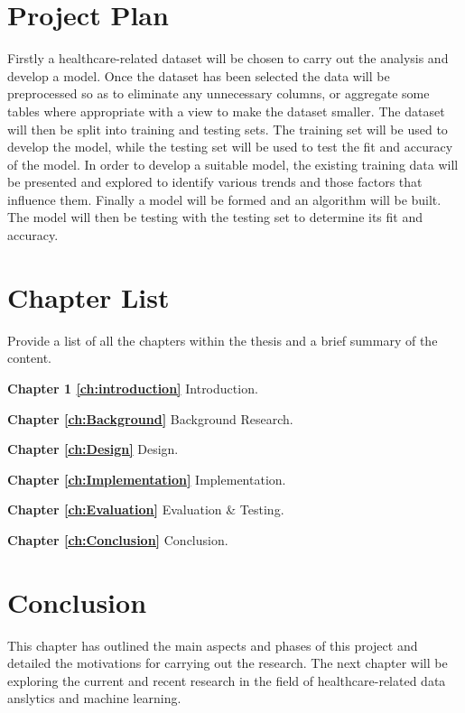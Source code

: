 \section{Project Plan}
Firstly a healthcare-related dataset will be chosen to carry out the analysis and develop a model. Once the dataset has been selected the data will be preprocessed so as to eliminate any unnecessary columns, or aggregate some tables where appropriate with a view to make the dataset smaller.
The dataset will then be split into training and testing sets. The training set will be used to develop the model, while the testing set will be used to test the fit and accuracy of the model.
In order to develop a suitable model, the existing training data will be presented and explored to identify various trends and those factors that influence them.
Finally a model will be formed and an algorithm will be built.
The model will then be testing with the testing set to determine its fit and accuracy.


\section{Chapter List}
Provide a list of all the chapters within the thesis and a brief summary of the content.

\textbf{Chapter 1 \ref{ch:introduction}} Introduction. 

\textbf{Chapter \ref{ch:Background}} Background Research. 

\textbf{Chapter \ref{ch:Design}} Design. 

\textbf{Chapter \ref{ch:Implementation}} Implementation. 

\textbf{Chapter \ref{ch:Evaluation}} Evaluation \& Testing. 

\textbf{Chapter \ref{ch:Conclusion}} Conclusion. 


\section{Conclusion}
This chapter has outlined the main aspects and phases of this project and detailed the motivations for carrying out the research. 
The next chapter will be exploring the current and recent research in the field of healthcare-related data anslytics and machine learning.

